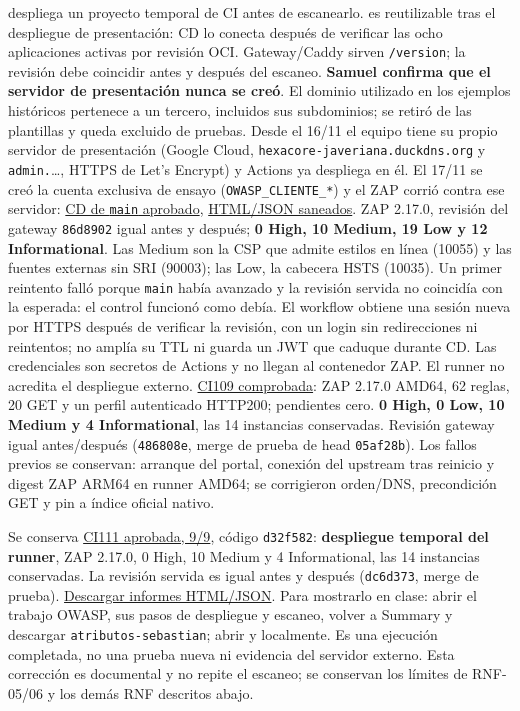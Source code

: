  despliega un proyecto temporal de CI antes de
escanearlo.  es reutilizable tras el despliegue de
presentación: CD lo conecta después de verificar las ocho aplicaciones activas
por revisión OCI. Gateway/Caddy sirven \texttt{/version}; la revisión debe
coincidir antes y después del escaneo. \textbf{Samuel confirma que el servidor de
presentación nunca se creó}. El dominio utilizado en los ejemplos históricos
pertenece a un tercero, incluidos sus subdominios; se retiró de las plantillas y
queda excluido de pruebas. Desde el 16/11 el equipo tiene su propio servidor de
presentación (Google Cloud, \texttt{hexacore-javeriana.duckdns.org} y \texttt{admin.}\ldots, HTTPS de
Let's Encrypt) y Actions ya despliega en él. El 17/11 se creó la cuenta exclusiva de ensayo
(\texttt{OWASP\_CLIENTE\_*}) y el ZAP corrió contra ese servidor:
\href{https://github.com/Emperador24/HEXACORE/actions/runs/44044715233}{CD de \texttt{main} aprobado},
\href{https://github.com/Emperador24/HEXACORE/actions/runs/44044715233/artifacts/14311052588}{HTML/JSON saneados}. ZAP 2.17.0, revisión del gateway
\texttt{86d8902} igual antes y después; \textbf{0 High, 10 Medium, 19 Low y 12
Informational}. Las Medium son la CSP que admite estilos en línea (10055) y las fuentes
externas sin SRI (90003); las Low, la cabecera HSTS (10035). Un primer reintento falló porque
\texttt{main} había avanzado y la revisión servida no coincidía con la esperada: el control
funcionó como debía. El workflow obtiene una sesión nueva por HTTPS
después de verificar la revisión, con un login sin redirecciones ni reintentos;
no amplía su TTL ni guarda un JWT que caduque durante CD. Las credenciales
son secretos de Actions y no llegan al contenedor ZAP. El runner no acredita
el despliegue externo.
\href{https://github.com/Emperador24/HEXACORE/actions/runs/43995508643/artifacts/14290455753}{CI109 comprobada}:
ZAP 2.17.0 AMD64, 62 reglas, 20 GET y un perfil autenticado HTTP200; pendientes
cero. \textbf{0 High, 0 Low, 10 Medium y 4 Informational}, las 14 instancias
conservadas. Revisión gateway igual antes/después (\texttt{486808e}, merge de
prueba de head \texttt{05af28b}). Los fallos previos se conservan: arranque del
portal, conexión del upstream tras reinicio y digest ZAP ARM64 en runner AMD64;
se corrigieron orden/DNS, precondición GET y pin a índice oficial nativo.

Se conserva \href{https://github.com/Emperador24/HEXACORE/actions/runs/44000569216}{CI111 aprobada, 9/9},
código \texttt{d32f582}: \textbf{despliegue temporal del runner}, ZAP 2.17.0,
0 High, 10 Medium y 4 Informational, las 14 instancias conservadas. La revisión
servida es igual antes y después (\texttt{dc6d373}, merge de prueba).
\href{https://github.com/Emperador24/HEXACORE/actions/runs/44000569216/artifacts/14291638302}{Descargar informes HTML/JSON}.
Para mostrarlo en clase: abrir el trabajo OWASP, sus pasos de despliegue y escaneo,
volver a Summary y descargar \texttt{atributos-sebastian}; abrir 
y  localmente. Es una ejecución completada, no una prueba nueva
ni evidencia del servidor externo. Esta corrección es documental y no repite el
escaneo; se conservan los límites de RNF-05/06 y los demás RNF descritos abajo.

